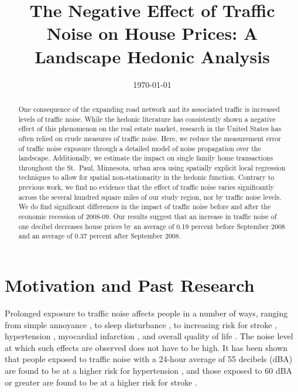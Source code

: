 \documentclass{article}\usepackage{graphicx, color}
\title{The Negative Effect of Traffic Noise on House Prices: A Landscape Hedonic Analysis}
\date{\today}
\begin{document}
\maketitle
\begin{singlespace}
\begin{abstract}
One consequence of the expanding road network and its associated traffic is increased levels of traffic noise.  While the hedonic literature has consistently shown a negative effect of this phenomenon on the real estate market, research in the United States has often relied on crude measures of traffic noise. Here, we reduce the measurement error of traffic noise exposure through a detailed model of noise propagation over the landscape. Additionally, we estimate the impact on single family home transactions throughout the St.\ Paul, Minnesota, urban area using spatially explicit local regression techniques to allow for spatial non-stationarity in the hedonic function. Contrary to previous work, we find no evidence that the effect of traffic noise varies significantly across the several hundred square miles of our study region, nor by traffic noise levels. We do find significant differences in the impact of traffic noise before and after the economic recession of 2008-09. Our results suggest that an increase in traffic noise of one decibel decreases house prices by an average of 0.19 percent before September 2008 and an average of 0.37 percent after September 2008.
\end{abstract}
\end{singlespace}

\newpage
\section{Motivation and Past Research}\label{sec:lit}
Prolonged exposure to traffic noise affects people in a number of ways, ranging from simple annoyance \citep{Miedema2001, Ouis2001, Ohrstrom2007, DeKluizenaar2013, Weinhold2013}, to sleep disturbance , to increasing risk for stroke \citep{Sorensen2011}, hypertension \citep{Jarup2008, Bodin2009}, myocardial infarction \citep{Babisch2005}, and overall quality of life \citep{Shepherd2013}. The noise level at which such effects are observed does not have to be high.  It has been shown that people exposed to traffic noise with a 24-hour average of 55 decibels (dBA) are found to be at a higher risk for hypertension \citep{Barregard2009, Bodin2009}, and those exposed to 60 dBA or greater are found to be at a higher risk for stroke \citep{Sorensen2011}.  
\end{document}
